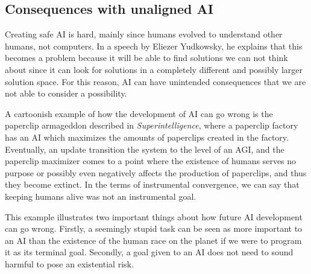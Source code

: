 \documentclass[12pt,A4]{report}
\theoremstyle{definition}
\begin{document}


\subsection{Consequences with unaligned AI}
Creating safe AI is hard, mainly since humans evolved to understand other humans, not computers. In a speech by Eliezer Yudkowsky, he explains that this becomes a problem because it will be able to find solutions we can not think about since it can look for solutions in a completely different and possibly larger solution space\autocite{Yudkowsky's speech}. For this reason, AI can have unintended consequences that we are not able to consider a possibility. 

A cartoonish example of how the development of AI can go wrong is the paperclip armageddon described in \textit{Superintelligence}, where a paperclip factory has an AI which maximizes the amounts of paperclips created in the factory. Eventually, an update transition the system to the level of an AGI, and the paperclip maximizer comes to a point where the existence of humans serves no purpose or possibly even negatively affects the production of paperclips, and thus they become extinct. In the terms of instrumental convergence, we can say that keeping humans alive was not an instrumental goal. 

This example illustrates two important things about how future AI development can go wrong. Firstly, a seemingly stupid task can be seen as more important to an AI than the existence of the human race on the planet if we were to program it as its terminal goal. Secondly, a goal given to an AI does not need to sound harmful to pose an existential risk. 
\end{document}
